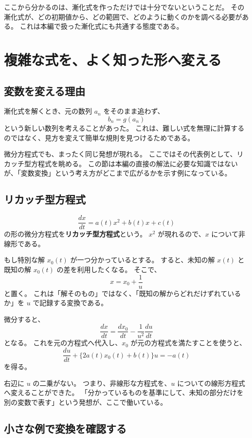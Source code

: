 ここから分かるのは、漸化式を作っただけでは十分でないということだ。
その漸化式が、どの初期値から、どの範囲で、どのように動くのかを調べる必要がある。
これは本編で扱った漸化式にも共通する態度である。

\section{複雑な式を、よく知った形へ変える}

\subsection{変数を変える理由}

漸化式を解くとき、元の数列 $a_n$ をそのまま追わず、
\[
  b_n=g(a_n)
\]
という新しい数列を考えることがあった。
これは、難しい式を無理に計算するのではなく、見方を変えて簡単な規則を見つけるためである。

微分方程式でも、まったく同じ発想が現れる。
ここではその代表例として、リカッチ型方程式を眺める。
この節は本編の直接の解法に必要な知識ではないが、「変数変換」という考え方がどこまで広がるかを示す例になっている。

\subsection{リカッチ型方程式}

\[
  \frac{dx}{dt}=a(t)x^2+b(t)x+c(t)
\]
の形の微分方程式を\textbf{リカッチ型方程式}という。
$x^2$ が現れるので、$x$ について非線形である。

もし特別な解 $x_0(t)$ が一つ分かっているとする。
すると、未知の解 $x(t)$ と既知の解 $x_0(t)$ の差を利用したくなる。
そこで、
\[
  x=x_0+\frac1u
\]
と置く。
これは「解そのもの」ではなく、「既知の解からどれだけずれているか」を $u$ で記録する変換である。

微分すると、
\[
  \frac{dx}{dt}=\frac{dx_0}{dt}-\frac1{u^2}\frac{du}{dt}
\]
となる。
これを元の方程式へ代入し、$x_0$ が元の方程式を満たすことを使うと、
\[
  \frac{du}{dt}+\{2a(t)x_0(t)+b(t)\}u=-a(t)
\]
を得る。

右辺に $u$ の二乗がない。
つまり、非線形な方程式を、$u$ についての線形方程式へ変えることができた。
「分かっているものを基準にして、未知の部分だけを別の変数で表す」という発想が、ここで働いている。

\subsection{小さな例で変換を確認する}


